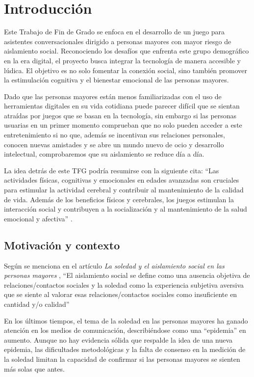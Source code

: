 \section{Introducción}
Este Trabajo de Fin de Grado se enfoca en el desarrollo de un juego para asistentes conversacionales dirigido a personas mayores con mayor riesgo de aislamiento social. Reconociendo los desafíos que enfrenta este grupo demográfico en la era digital, el proyecto busca integrar la tecnología de manera accesible y lúdica. El objetivo es no solo fomentar la conexión social, sino también promover la estimulación cognitiva y el bienestar emocional de las personas mayores.

Dado que las personas mayores están menos familiarizadas con el uso de herramientas digitales en su vida cotidiana puede parecer difícil que se sientan atraídas por juegos que se basan en la tecnología, sin embargo si las personas usuarias en un primer momento comprueban que no solo pueden acceder a este entretenimiento si no que, además se incentivan sus relaciones personales, conocen nuevas amistades y se abre un mundo nuevo de ocio y desarrollo intelectual, comprobaremos que su aislamiento se reduce día a día.

La idea detrás de este TFG podría resumirse con la siguiente cita: \enquote{Las actividades físicas, cognitivas y emocionales en edades avanzadas son cruciales para estimular la actividad cerebral y contribuir al mantenimiento de la calidad de vida. Además de los beneficios físicos y cerebrales, los juegos estimulan la interacción social y contribuyen a la socialización y al mantenimiento de la salud emocional y afectiva} \parencite{intro3}.


\subsection{Motivación y contexto}

Según se menciona en el artículo \textit{La soledad y el aislamiento social en las personas mayores} \parencite{ArruebarrenaCabaco2020}, \enquote{El aislamiento social se define como una ausencia objetiva de relaciones/contactos sociales y la soledad
como la experiencia subjetiva aversiva que se siente al valorar esas relaciones/contactos sociales como
insuficiente en cantidad y/o calidad}

En los últimos tiempos, el tema de la soledad en las personas mayores ha ganado atención en los medios de comunicación, describiéndose como una \enquote{epidemia} en aumento. Aunque no hay evidencia sólida que respalde la idea de una nueva epidemia, las dificultades metodológicas y la falta de consenso en la medición de la soledad limitan la capacidad de confirmar si las personas mayores se sienten más solas que antes.

